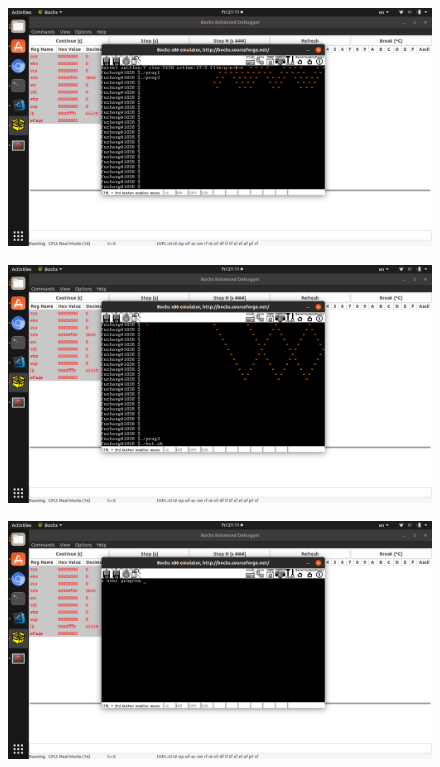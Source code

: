 \documentclass[a4paper,11pt,UTF8]{ctexart}
\newcommand{\bottomcaption}{%
\setlength{\abovecaptionskip}{6pt}%
\setlength{\belowcaptionskip}{6pt}%
\caption}
\newcommand{\xiaowuhao}{\fontsize{9pt}{\baselineskip}\selectfont}   %
\begin{document}
  \begin{figure}[!htbp]
    \centering
    \includegraphics[width=\textwidth]{imgs/Screenshot_from_2019-03-29_21-11-20.png}
    \bottomcaption{\xiaowuhao{这里的下卷功能非常方便，输入若干回车之后，保持下端标识完整}}
  \end{figure}
  \begin{figure}[!htbp]
    \centering
    \includegraphics[width=\textwidth]{imgs/Screenshot_from_2019-03-29_21-11-39.png}
    \bottomcaption{\xiaowuhao{执行用户批处理}}
  \end{figure}
  \begin{figure}[!htbp]
    \centering
    \includegraphics[width=\textwidth]{imgs/Screenshot_from_2019-03-29_21-11-51.png}
    \bottomcaption{\xiaowuhao{程序跳入执行，并成功返回}}
  \end{figure}
\end{document}
